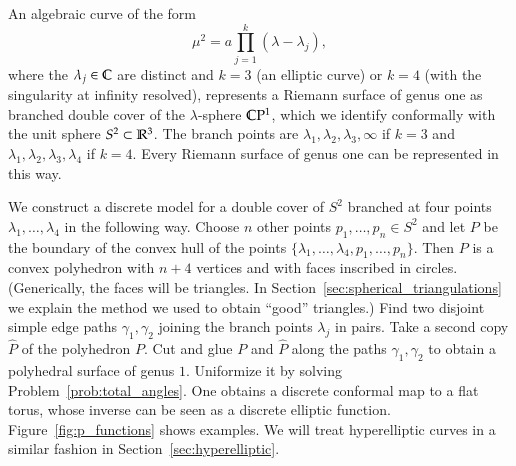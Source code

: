 \documentclass[Thesis]{subfiles}
\begin{document}
An algebraic curve of the form
\begin{equation}
  \label{eq:elliptic_curve}
  \mu^{2}=a\prod_{j=1}^{k}(\lambda-\lambda_{j}),
\end{equation}
where the $\lambda_{j}\in\mathbb C$ are distinct and $k=3$ (an elliptic
curve) or $k=4$ (with the singularity at infinity resolved),
represents a Riemann surface of genus one as branched double cover of
the $\lambda$-sphere $\mathbb C\mathrm{P}^{1}$, which we identify conformally
with the unit sphere $S^{2}\subset\mathbb R^{3}$. The branch points are
$\lambda_{1},\lambda_{2},\lambda_{3},\infty$ if $k=3$ and
$\lambda_{1},\lambda_{2},\lambda_{3},\lambda_{4}$ if $k=4$. Every
Riemann surface of genus one can be represented in this way.


We construct a discrete model for a double cover of $S^{2}$ branched
at four points $\lambda_1,\ldots,\lambda_{4}$ in the following way.
Choose $n$ other points $p_1,\ldots,p_n\in S^2$ and let $P$ be the
boundary of the convex hull of the points
$\{\lambda_1,\ldots,\lambda_{4},p_1,\ldots,p_n\}$. Then $P$ is a
convex polyhedron with $n+4$ vertices and with faces inscribed in
circles. (Generically, the faces will be triangles. In
Section~\ref{sec:spherical_triangulations} we explain the method we
used to obtain ``good'' triangles.) Find two disjoint simple edge
paths $\gamma_1,\gamma_{2}$ joining the branch points $\lambda_{j}$ in
pairs. Take a second copy $\hat P$ of the polyhedron $P$. Cut and glue
$P$ and $\hat P$ along the paths $\gamma_1,\gamma_{2}$ to obtain a
polyhedral surface of genus $1$. Uniformize it by solving
Problem~\ref{prob:total_angles}. One obtains a discrete conformal map
to a flat torus, whose inverse can be seen as a discrete elliptic
function. Figure~\ref{fig:p_functions} shows examples. We will treat
hyperelliptic curves in a similar fashion in
Section~\ref{sec:hyperelliptic}.
\end{document}
